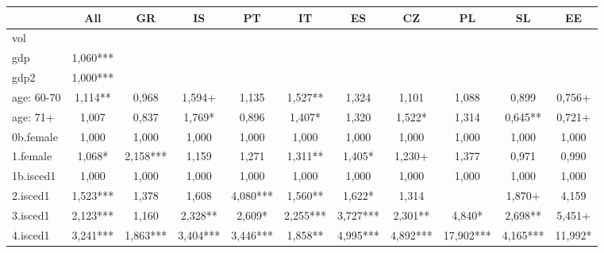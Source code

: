 {
\def\sym#1{\ifmmode^{#1}\else\(^{#1}\)\fi}
\begin{tabular}{l*{10}{c}}
\hline\hline
            &\multicolumn{1}{c}{All}&\multicolumn{1}{c}{GR}&\multicolumn{1}{c}{IS}&\multicolumn{1}{c}{PT}&\multicolumn{1}{c}{IT}&\multicolumn{1}{c}{ES}&\multicolumn{1}{c}{CZ}&\multicolumn{1}{c}{PL}&\multicolumn{1}{c}{SL}&\multicolumn{1}{c}{EE}\\
\hline
vol         &               &               &               &               &               &               &               &               &               &               \\
gdp         &       1,060***&               &               &               &               &               &               &               &               &               \\
gdp2        &       1,000***&               &               &               &               &               &               &               &               &               \\
age: 60-70  &       1,114** &       0,968   &       1,594+  &       1,135   &       1,527** &       1,324   &       1,101   &       1,088   &       0,899   &       0,756+  \\
age: 71+    &       1,007   &       0,837   &       1,769*  &       0,896   &       1,407*  &       1,320   &       1,522*  &       1,314   &       0,645** &       0,721+  \\
0b.female   &       1,000   &       1,000   &       1,000   &       1,000   &       1,000   &       1,000   &       1,000   &       1,000   &       1,000   &       1,000   \\
1.female    &       1,068*  &       2,158***&       1,159   &       1,271   &       1,311** &       1,405*  &       1,230+  &       1,377   &       0,971   &       0,990   \\
1b.isced1   &       1,000   &       1,000   &       1,000   &       1,000   &       1,000   &       1,000   &       1,000   &       1,000   &       1,000   &       1,000   \\
2.isced1    &       1,523***&       1,378   &       1,608   &       4,080***&       1,560** &       1,622*  &       1,314   &               &       1,870+  &       4,159   \\
3.isced1    &       2,123***&       1,160   &       2,328** &       2,609*  &       2,255***&       3,727***&       2,301** &       4,840*  &       2,698** &       5,451+  \\
4.isced1    &       3,241***&       1,863***&       3,404***&       3,446***&       1,858** &       4,995***&       4,892***&      17,902***&       4,165***&      11,992*  \\

\end{tabular}}
